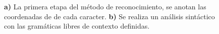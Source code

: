 \begin{figure}[h]
    \caption{\centering \textbf{a)} La primera etapa del método de reconocimiento, se anotan las coordenadas de de cada caracter. \textbf{b)} Se realiza un análisis sintáctico con las gramáticas libres de contexto definidas.}
    \label{fig:gramaticas}
\end{figure}


